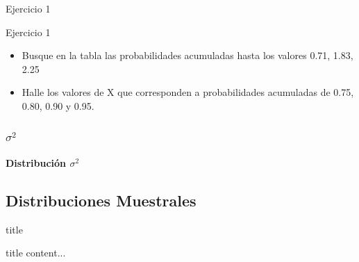 \documentclass[11pt]{beamer}
\begin{document}
      \begin{frame}{Ejercicio 1}
          \begin{block}{Ejercicio 1}
              \begin{itemize}
                  \item Busque en la tabla las probabilidades acumuladas hasta los valores 0.71, 1.83, 2.25
                  \item Halle los valores de X que corresponden a probabilidades acumuladas de 0.75, 0.80, 0.90 y 0.95.
              \end{itemize}
          \end{block}
      \end{frame}


      \subsubsection*{$\sigma^2$}
        \begin{frame}{}
\begin{center}
    \textbf{            \huge Distribución $\sigma^2$}
\end{center}
        \end{frame}

    \subsection*{Distribuciones Muestrales}
    \begin{frame}{title}
        \begin{block}{title}
            content...
        \end{block}
    \end{frame}
\end{document}
